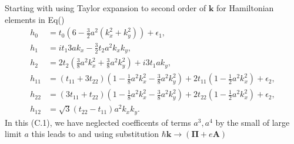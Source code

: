\documentclass{report}
\newcommand{\f}[2]{\dfrac{#1}{#2}}
\begin{document}
Starting with using Taylor expansion to second order of $\mathbf{k}$ for Hamiltonian elements in Eq()
\begin{equation}
	\begin{aligned}
		h_{0}  & = t_{0} (6 - \frac{3}{2} a^{2} (k_{x}^{2} + k_{y}^{2})) + \epsilon_{1} ,                                                                         \\
		h_{1}  & = i t_{1} 3a k_{x} - \frac{3}{2} t_{2} a^{2} k_{x}k_{y}    ,                                                                                     \\
		h_{2}  & = 2 t_{2} (\frac{3}{8} a^{2} k_{x}^{2} + \frac{3}{8} a^{2} k_{y}^{2}) + i 3 t_{1} a k_{y}          ,                                             \\
		h_{11} & = (t_{11} + 3 t_{22}) (1 - \frac{1}{8}a^{2} k_{x}^{2} - \frac{3}{8}a^{2} k_{y}^{2}) + 2 t_{11}(1 - \frac{1}{2} a^{2} k_{x}^{2}) + \epsilon_{2} , \\
		h_{22} & = (3 t_{11} + t_{22}) (1 - \frac{1}{8}a^{2} k_{x}^{2} - \frac{3}{8}a^{2} k_{y}^{2}) + 2 t_{22}(1 - \frac{1}{2} a^{2} k_{x}^{2}) + \epsilon_{2} , \\
		h_{12} & = \sqrt{3} (t_{22} - t_{11}) a^{2} k_{x} k_{y}.
	\end{aligned}
\end{equation}
In this (C.1), we have neglected coefficents of terms $a^{3},a^{4}$ by the small of large limit $a$ this leads to
and using substitution $\hbar\mathbf{k} \rightarrow (\mathbf{\Pi} + e\mathbf{A})$
\end{document}
